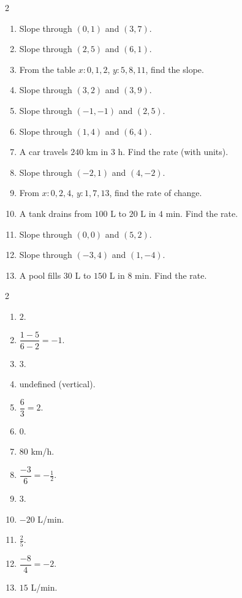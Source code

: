 \documentclass[11pt]{article}
\begin{document}
\begin{recapbox}
\begin{multicols}{2}
\small
\begin{enumerate}[leftmargin=*,itemsep=3pt]
  \item Slope through $(0,1)$ and $(3,7)$.
  \item Slope through $(2,5)$ and $(6,1)$.
  \item From the table $x:0,1,2$, $y:5,8,11$, find the slope.
  \item Slope through $(3,2)$ and $(3,9)$.
  \item Slope through $(-1,-1)$ and $(2,5)$.
  \item Slope through $(1,4)$ and $(6,4)$.
  \item A car travels $240$ km in $3$ h. Find the rate (with units).
  \item Slope through $(-2,1)$ and $(4,-2)$.
  \item From $x:0,2,4$, $y:1,7,13$, find the rate of change.
  \item A tank drains from $100$ L to $20$ L in $4$ min. Find the rate.
  \item Slope through $(0,0)$ and $(5,2)$.
  \item Slope through $(-3,4)$ and $(1,-4)$.
  \item A pool fills $30$ L to $150$ L in $8$ min. Find the rate.
\end{enumerate}
\end{multicols}
\end{recapbox}

\begin{keybox}
\begin{multicols}{2}
\small
\begin{enumerate}[leftmargin=*,itemsep=3pt]
  \item $2$.
  \item $\dfrac{1-5}{6-2}=-1$.
  \item $3$.
  \item undefined (vertical).
  \item $\dfrac{6}{3}=2$.
  \item $0$.
  \item $80$ km/h.
  \item $\dfrac{-3}{6}=-\tfrac12$.
  \item $3$.
  \item $-20$ L/min.
  \item $\tfrac25$.
  \item $\dfrac{-8}{4}=-2$.
  \item $15$ L/min.
\end{enumerate}
\end{multicols}
\end{keybox}
\end{document}
